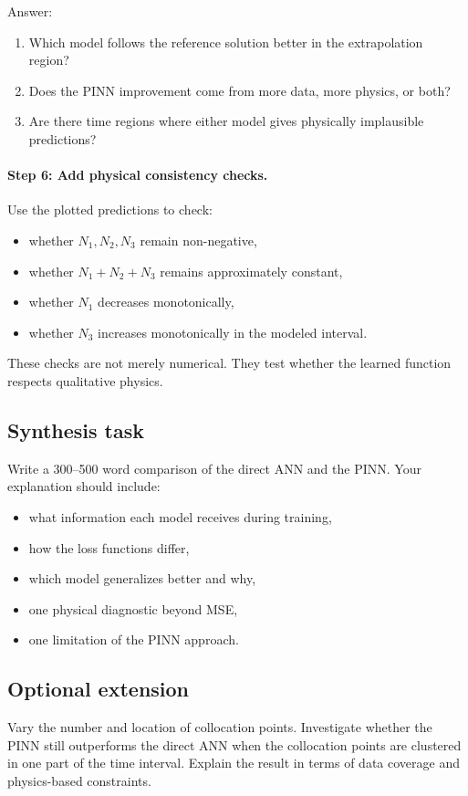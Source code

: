 Answer:
\begin{enumerate}
    \item Which model follows the reference solution better in the extrapolation region?
    \item Does the PINN improvement come from more data, more physics, or both?
    \item Are there time regions where either model gives physically implausible predictions?
\end{enumerate}

\paragraph{Step 6: Add physical consistency checks.}
Use the plotted predictions to check:
\begin{itemize}
    \item whether \(N_1,N_2,N_3\) remain non-negative,
    \item whether \(N_1+N_2+N_3\) remains approximately constant,
    \item whether \(N_1\) decreases monotonically,
    \item whether \(N_3\) increases monotonically in the modeled interval.
\end{itemize}

These checks are not merely numerical. They test whether the learned function respects qualitative physics.

\subsection*{Synthesis task}
Write a 300--500 word comparison of the direct ANN and the PINN. Your explanation should include:
\begin{itemize}
    \item what information each model receives during training,
    \item how the loss functions differ,
    \item which model generalizes better and why,
    \item one physical diagnostic beyond MSE,
    \item one limitation of the PINN approach.
\end{itemize}

\subsection*{Optional extension}
Vary the number and location of collocation points. Investigate whether the PINN still outperforms the direct ANN when the collocation points are clustered in one part of the time interval. Explain the result in terms of data coverage and physics-based constraints.
